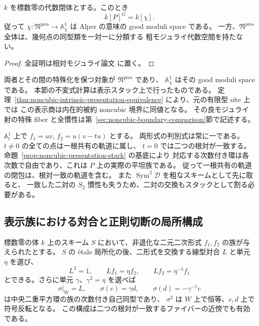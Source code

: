 \begin{proposition}
\label{prop:noncubic-good-moduli}
$k$ を標数零の代数閉体とする。このとき
\[
 k[P]^G=k[\chi].
\]
従って $\chi:\mathfrak N^{\mathrm{pres}}\to\mathbb A^1_\chi$ は
Alper の意味の good moduli space である。
一方、$\mathfrak N^{\mathrm{pres}}$ 全体は、幾何点の同型類を一対一に分類する
粗モジュライ代数空間を持たない。
\end{proposition}

\begin{proof}
全証明は相対モジュライ論文 \cite[\texttt{noncubic_stack}]{QuadricModuli2026} に置く。
\end{proof}

両者とその間の特殊化を保つ対象が $\mathfrak N^{\mathrm{pres}}$ であり、
$\mathbb A^1_\chi$ はその good moduli space である。
本節の不変式計算は表示スタック上で行ったものである。
定理~\ref{thm:noncubic-intrinsic-presentation-equivalence} により、元の有限型 site 上では
この表示商は内在的被約 noncubic 境界に同値となる。
その良モジュライ射の特殊 fiber と全慣性は第~\ref{sec:noncubic-boundary-comparison}節で記述する。

\begin{example}[共有根から根対一致への特殊化]
\label{ex:noncubic-specialization}
$\mathbb A^1_t$ 上で $f_1=uv$, $f_2=u(v-tu)$ とする。
両形式の判別式は常に一である。$t\ne0$ の全ての点は一根共有の軌道に属し、
$t=0$ では二つの根対が一致する。命題~\ref{prop:noncubic-presentation-stack} の基底により
対応する次数付き環は各次数で自由であり、これは $P$ 上の実際の平坦族である。
従って一根共有の軌道の閉包は、根対一致の軌道を含む。
また $\operatorname{Sym}^2\mathcal D$ を粗なスキームとして先に取ると、
一致した二対の $S_2$ 慣性も失うため、二対の交換もスタックとして割る必要がある。
\end{example}

\subsection{表示族における対合と正則切断の局所構成}
\label{subsec:noncubic-relative-root}

\begin{lemma}
\label{lem:noncubic-local-exchange}
標数零の体 $k$ 上のスキーム $S$ において、非退化な二元二次形式
$f_1,f_2$ の族が与えられたとする。
$S$ の \'etale 局所化の後、二形式を交換する線型対合 $L$ と単元 $\eta$ を選び、
\[
 L^2=1,\qquad Lf_1=\eta f_2,\qquad Lf_2=\eta^{-1}f_1
\]
とできる。さらに単元 $\gamma$、$\gamma^2=\eta$ を選べば
\[
 \sigma|_W=L,\qquad \sigma(c)=\gamma d,\qquad
 \sigma(d)=-\gamma^{-1}c
\]
は中央二重平方環の族の次数付き自己同型であり、
$\sigma^2$ は $W$ 上で恒等、$c,d$ 上で符号反転となる。
この構成は二つの根対が一致するファイバーの近傍でも有効である。
\end{lemma}

